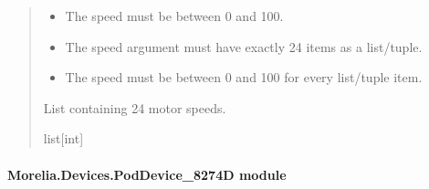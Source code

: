 \documentclass[letterpaper,10pt,english]{sphinxmanual}
\begin{document}
\begin{fulllineitems}
\begin{fulllineitems}
\begin{quote}
\begin{description}
\begin{itemize}
\item {} 
\sphinxAtStartPar
{} \textendash{} The speed must be between 0 and 100.

\item {} 
\sphinxAtStartPar
{} \textendash{} The speed argument must have exactly 24 items as a list/tuple.

\item {} 
\sphinxAtStartPar
{} \textendash{} The speed must be between 0 and 100 for every list/tuple item.

\end{itemize}

\sphinxAtStartPar
List containing 24 motor speeds.

\sphinxAtStartPar
list{[}int{]}

\end{description}\end{quote}

\end{fulllineitems}


\end{fulllineitems}



\paragraph{Morelia.Devices.PodDevice\_8274D module}
\label{\detokenize{Morelia.Devices:module-Morelia.Devices.PodDevice_8274D}}\label{\detokenize{Morelia.Devices:morelia-devices-poddevice-8274d-module}}
\end{document}
